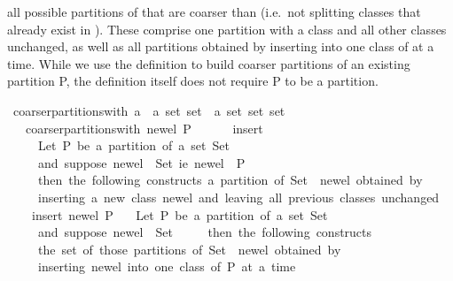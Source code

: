 \begin{isabellebody}
\begin{isamarkuptext}
  all possible partitions of  that are coarser than 
  (i.e.\ not splitting classes that already exist in ).  These comprise one partition 
  with a class  and all other classes unchanged,
  as well as all partitions obtained by inserting  into one class of  at a time. While we use the definition to build coarser partitions of an existing partition P, the definition itself does not require P to be a partition.%
\end{isamarkuptext}%
\isamarkuptrue%
\isamarkupfalse%
\ coarser{\isacharunderscore}partitions{\isacharunderscore}with\ {\isacharcolon}{\isacharcolon}{\isachardoublequoteopen}{\isacharprime}a\ {\isasymRightarrow}\ {\isacharprime}a\ set\ set\ {\isasymRightarrow}\ {\isacharprime}a\ set\ set\ set{\isachardoublequoteclose}\isanewline
\ \ \ {\isachardoublequoteopen}coarser{\isacharunderscore}partitions{\isacharunderscore}with\ new{\isacharunderscore}el\ P\ {\isacharequal}\ \isanewline
\ \ \ \ insert\isanewline
\ \ \ \ {\isacharparenleft}{\isacharasterisk}\ Let\ P\ be\ a\ partition\ of\ a\ set\ Set{\isacharcomma}\isanewline
\ \ \ \ \ and\ suppose\ new{\isacharunderscore}el\ {\isasymnotin}\ Set{\isacharcomma}\ i{\isachardot}e{\isachardot}\ {\isacharbraceleft}new{\isacharunderscore}el{\isacharbraceright}\ {\isasymnotin}\ P{\isacharcomma}\isanewline
\ \ \ \ \ then\ the\ following\ constructs\ a\ partition\ of\ {\isacharprime}Set\ {\isasymunion}\ {\isacharbraceleft}new{\isacharunderscore}el{\isacharbraceright}{\isacharprime}\ obtained\ by\isanewline
\ \ \ \ \ inserting\ a\ new\ class\ {\isacharbraceleft}new{\isacharunderscore}el{\isacharbraceright}\ and\ leaving\ all\ previous\ classes\ unchanged{\isachardot}\ {\isacharasterisk}{\isacharparenright}\isanewline
\ \ \ \ {\isacharparenleft}insert\ {\isacharbraceleft}new{\isacharunderscore}el{\isacharbraceright}\ P{\isacharparenright}\isanewline
\ \ {\isacharparenleft}{\isacharasterisk}\ Let\ P\ be\ a\ partition\ of\ a\ set\ Set{\isacharcomma}\isanewline
\ \ \ \ \ and\ suppose\ new{\isacharunderscore}el\ {\isasymnotin}\ Set{\isacharcomma}\isanewline
\ \ \ \ \ then\ the\ following\ constructs\isanewline
\ \ \ \ \ the\ set\ of\ those\ partitions\ of\ {\isacharprime}Set\ {\isasymunion}\ {\isacharbraceleft}new{\isacharunderscore}el{\isacharbraceright}{\isacharprime}\ obtained\ by\isanewline
\ \ \ \ \ inserting\ new{\isacharunderscore}el\ into\ one\ class\ of\ P\ at\ a\ time{\isachardot}\ {\isacharasterisk}{\isacharparenright}\isanewline

\end{isabellebody}
